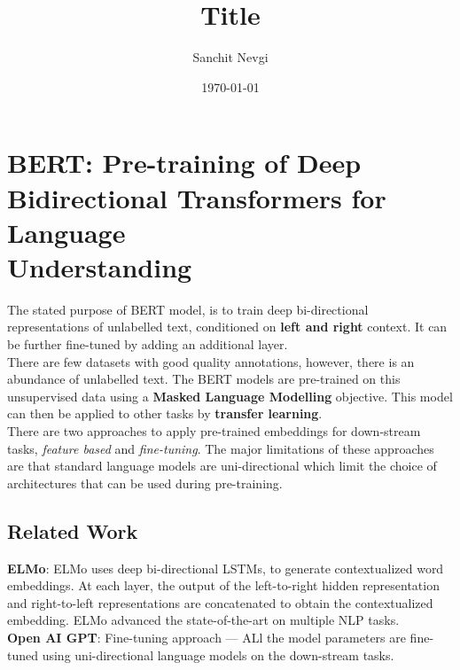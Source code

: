 \documentclass[12pt]{article}
\begin{document}
\title{\textbf{\huge{Title}}}

\date{\today}
\author{Sanchit Nevgi}

\section*{BERT: Pre-training of Deep Bidirectional Transformers for Language \\ Understanding}

The stated purpose of BERT model, is to train deep bi-directional representations of unlabelled text, conditioned on \textbf{left and right} context. It can be further fine-tuned by adding an additional layer. \\
There are few datasets with good quality annotations, however, there is an abundance of unlabelled text. The BERT models are pre-trained on this unsupervised data using a \textbf{Masked Language Modelling} objective. This model can then be applied to other tasks by \textbf{transfer learning}. \\
There are two approaches to apply pre-trained embeddings for down-stream tasks, \textit{feature based} and \textit{fine-tuning}. The major limitations of these approaches are that standard language models are uni-directional which limit the choice of architectures that can be used during pre-training.

\subsection*{Related Work}

\textbf{ELMo}: ELMo uses deep bi-directional LSTMs, to generate contextualized word embeddings. At each layer, the output of the left-to-right hidden representation and right-to-left representations are concatenated to obtain the contextualized embedding. ELMo advanced the state-of-the-art on multiple NLP tasks.\\
\textbf{Open AI GPT}: Fine-tuning approach --- ALl the model parameters are fine-tuned using uni-directional language models on the down-stream tasks.
\end{document}
